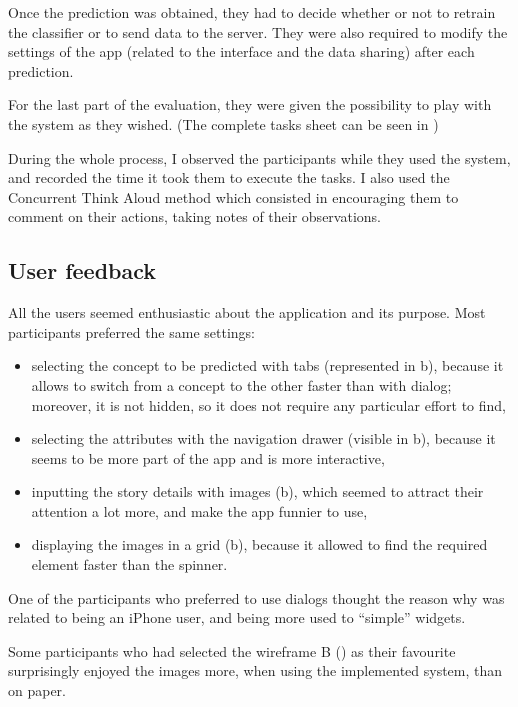 \documentclass{mproj}
\begin{document}
Once the prediction was obtained, they had to decide whether or not to retrain the classifier or to send data to the server. They were also required to modify the settings of the app (related to the interface and the data sharing) after each prediction. \par

For the last part of the evaluation, they were given the possibility to play with the system as they wished. (The complete tasks sheet can be seen in )\par

During the whole process, I observed the participants while they used the system, and recorded the time it took them to execute the tasks. I also used the Concurrent Think Aloud method \cite{usabilitytest} which consisted in encouraging them to comment on their actions, taking notes of their observations.

\subsection{User feedback}

All the users seemed enthusiastic about the application and its purpose. Most participants preferred the same settings:
\begin{itemize}[topsep=0pt]
	\item selecting the concept to be predicted with tabs (represented in b), because it allows to switch from a concept to the other faster than with dialog; moreover, it is not hidden, so it does not require any particular effort to find,
	\item selecting the attributes with the navigation drawer (visible in b), because it seems to be more part of the app and is more interactive,
	\item inputting the story details with images (b), which seemed to attract their attention a lot more, and make the app funnier to use,
	\item displaying the images in a grid (b), because it allowed to find the required element faster than the spinner.
\end{itemize}

One of the participants who preferred to use dialogs thought the reason why was related to being an iPhone user, and being more used to ``simple'' widgets.

Some participants who had selected the wireframe B () as their favourite surprisingly enjoyed the images more, when using the implemented system, than on paper.
\end{document}
